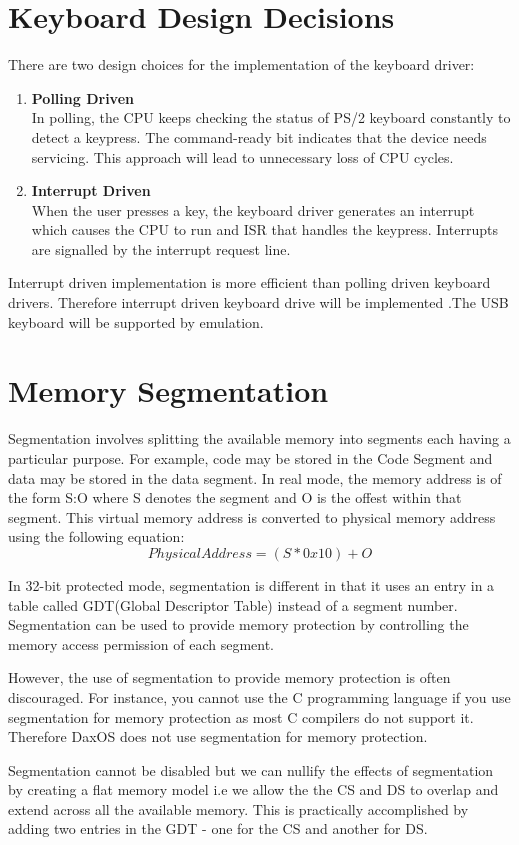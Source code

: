 \section{Keyboard Design Decisions}
\begin{flushleft}
	There are two design choices for the implementation of the keyboard driver:
	\begin{enumerate}
		\item \textbf{Polling Driven}\\
		In polling, the CPU keeps checking the status of PS/2 keyboard constantly to detect a keypress. The command-ready bit indicates that the 
		device needs servicing. This approach will lead to unnecessary loss of CPU cycles.
		\item \textbf{Interrupt Driven} \\
		When the user presses a key, the keyboard driver generates an interrupt which causes the CPU to run and ISR that handles the keypress.
		Interrupts are signalled by the interrupt request line.	
	\end{enumerate}
Interrupt driven implementation is more efficient than polling driven keyboard drivers.
Therefore interrupt driven keyboard drive will be implemented .The USB keyboard will be
supported by emulation.

\end{flushleft}

\section{Memory Segmentation}
\begin{flushleft}
	Segmentation involves splitting the available memory into segments each having a particular purpose. For example, code may be stored in the Code Segment and data may be stored in the data segment. In real mode, the memory address is of the form S:O where S denotes the segment and O is the offest within that segment. This virtual memory address is converted to physical memory address using the following equation:
	\[Physical Address = (S * 0x10) + O\]
	
	In 32-bit protected mode, segmentation is different in that it uses an entry in a table called GDT(Global Descriptor Table) instead of a segment number.
	Segmentation can be used to provide memory protection by controlling the memory access permission of each segment. 
	
	However, the use of segmentation to provide memory protection is often discouraged. For instance, you cannot use the C programming language if you use segmentation for memory protection as most C compilers do not support it. Therefore DaxOS does not use segmentation for memory protection. 
	
	Segmentation cannot be disabled but we can nullify the effects of segmentation by creating a flat memory model i.e we allow the the CS and DS to overlap and extend across all the available memory. This is practically accomplished by adding two entries in the GDT - one for the CS and another for DS. 
\end{flushleft}